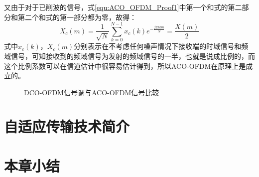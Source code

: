 又由于对于已削波的信号，式\ref{equ:ACO_OFDM_Proof1}中第一个和式的第二部分和第二个和式的第一部分都为零，故得：
\begin{equation}
X_{c}(m)=\frac{1}{\sqrt{N}}\sum \limits_{k=0}^{N-1}x_{c}(k)e^{-\frac{j2\pi km}{N}}=\frac{X(m)}{2}
\label{equ:ACO_OFDM_Proof3}
\end{equation}
式中$x_c(k)$，$X_c(m)$分别表示在不考虑任何噪声情况下接收端的时域信号和频域信号，可知接收到的频域信号为发射的频域信号的一半，也就是说成比例的，而这个比例系数可以在信道估计中很容易估计得到，所以ACO-OFDM在原理上是成立的。

\begin{figure}[h]
    \centering
    \caption{DCO-OFDM信号调与ACO-OFDM信号比较}
    \label{fig:DCO-OFDMVSACO-OFDM}
\end{figure}
\section{自适应传输技术简介}
\section{本章小结}
